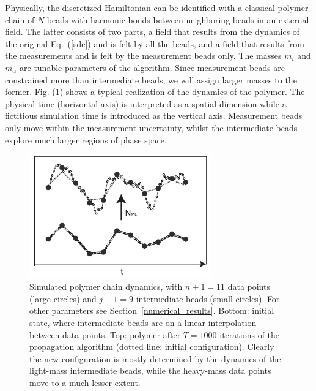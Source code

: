 \documentclass[11pt]{article}
\theoremstyle{definition}
\begin{document}
Physically, the discretized Hamiltonian can be identified with a classical polymer chain of $N$ beads with harmonic bonds between neighboring beads in an external field. The latter consists of two parts, a field that results from the dynamics of the original Eq.~(\ref{sde}) and is felt by all the beads, and a field that results from the measurements and is felt by the measurement beads only. The masses $m_i$ and $m_{\alpha}$ are tunable parameters of the algorithm. Since measurement beads are constrained more than intermediate beads, we will assign larger masses to the former. Fig. (\ref{fig:polymer}) shows a typical realization of the dynamics of the polymer. The physical time (horizontal axis) is interpreted as a spatial dimension while a fictitious simulation time is introduced as the vertical axis. Measurement beads only move within the measurement uncertainty, whilst the intermediate beads explore much larger regions of phase space.




\begin{figure}[htb!]
    \centering
    \includegraphics[width=0.7\textwidth]{FigPolymer2.pdf}
    \caption{Simulated polymer chain dynamics, with $n+1=11$ data points (large circles) and $j-1=9$ intermediate beads (small circles). For other parameters see Section~\ref{numerical_results}. Bottom: initial state, where intermediate beads are on a linear interpolation between data points. Top: polymer after $T=1000$ iterations of the propagation algorithm (dotted line: initial configuration). Clearly the new configuration is mostly determined by the dynamics of the light-mass intermediate beads, while the heavy-mass data points move to a much lesser extent.}
    \label{fig:polymer}
\end{figure}
\end{document}
